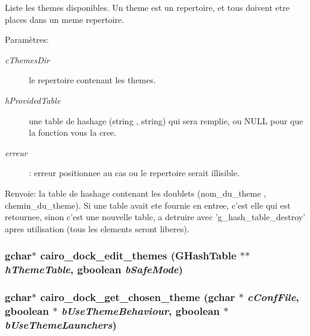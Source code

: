 Liste les themes disponibles. Un theme est un repertoire, et tous doivent etre places dans un meme repertoire. \begin{Desc}
\item[Paramètres:]
\begin{description}
\item[{\em cThemesDir}]le repertoire contenant les themes. \item[{\em hProvidedTable}]une table de hashage (string , string) qui sera remplie, ou NULL pour que la fonction vous la cree. \item[{\em erreur}]: erreur positionnee au cas ou le repertoire serait illisible. \end{description}
\end{Desc}
\begin{Desc}
\item[Renvoie:]la table de hashage contenant les doublets (nom\_\-du\_\-theme , chemin\_\-du\_\-theme). Si une table avait ete fournie en entree, c'est elle qui est retournee, sinon c'est une nouvelle table, a detruire avec 'g\_\-hash\_\-table\_\-destroy' apres utilisation (tous les elements seront liberes). \end{Desc}
\subsubsection{\setlength{\rightskip}{0pt plus 5cm}gchar$\ast$ cairo\_\-dock\_\-edit\_\-themes (GHashTable $\ast$$\ast$ {\em hThemeTable}, gboolean {\em bSafeMode})}\label{cairo-dock-themes-manager_8h_cef49939d0085c52a06d372b168f6ae0}


\subsubsection{\setlength{\rightskip}{0pt plus 5cm}gchar$\ast$ cairo\_\-dock\_\-get\_\-chosen\_\-theme (gchar $\ast$ {\em cConfFile}, gboolean $\ast$ {\em bUseThemeBehaviour}, gboolean $\ast$ {\em bUseThemeLaunchers})}\label{cairo-dock-themes-manager_8h_45bfce739852d43b48219926540d6769}


